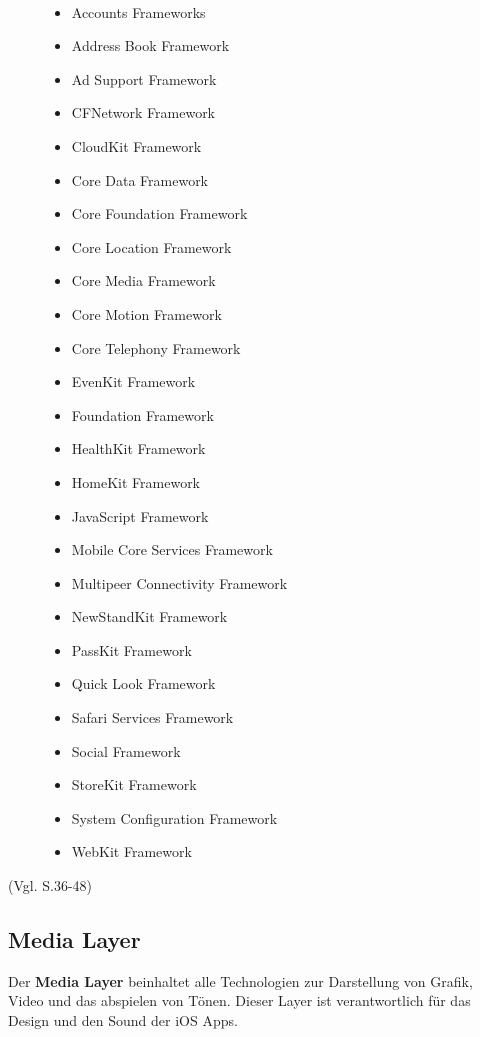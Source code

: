 \begin{description}	
	\item[\parbox{\textwidth} {Das Core Service Layer Framework beinhaltet folgende Frameworks}]~\par
	\begin{multicols}{2}
	\begin{itemize}
		\item Accounts Frameworks
		\item Address Book Framework
		\item Ad Support Framework
		\item CFNetwork Framework
		\item CloudKit Framework
		\item Core Data Framework
		\item Core Foundation Framework
		\item Core Location Framework
		\item Core Media Framework
		\item Core Motion Framework
		\item Core Telephony Framework
		\item EvenKit Framework
		\item Foundation Framework
		\item HealthKit Framework
		\item HomeKit Framework
		\item JavaScript Framework
		\item Mobile Core Services Framework
		\item Multipeer Connectivity Framework
		\item NewStandKit Framework
		\item PassKit Framework
		\item Quick Look Framework
		\item Safari Services Framework
		\item Social Framework
		\item StoreKit Framework
		\item System Configuration Framework
		\item WebKit Framework
	\end{itemize}
	\end{multicols}
\end{description}

(Vgl. \cite{Apple[6]} S.36-48)
\subsection{Media Layer}
\label{sec:MediaLayer}		
Der \textbf{Media Layer} beinhaltet alle Technologien zur Darstellung von Grafik, Video und das abspielen von Tönen. Dieser Layer ist verantwortlich für das Design und den Sound der iOS Apps. 

